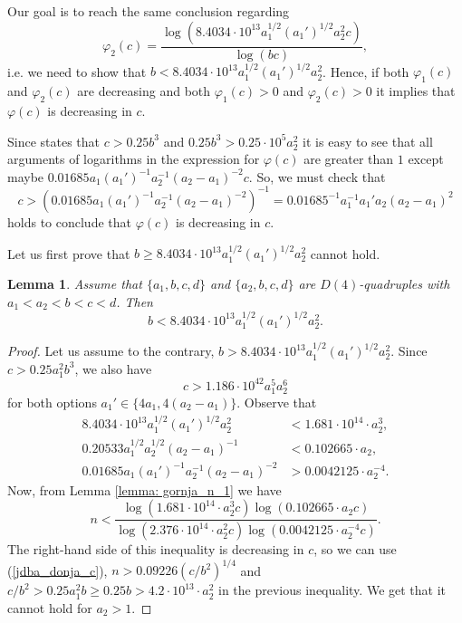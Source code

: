 \documentclass[12pt]{amsart}%
\newtheorem{lemma}[theorem]{Lemma}
\theoremstyle{definition}
\theoremstyle{remark}
\theoremstyle{plain}
\begin{document}
Our goal is to reach the same conclusion regarding
$$\varphi_2(c)=\frac{\log(8.4034 \cdot 10^{13} a_1^{1/2}(a_1')^{1/2}a_2^2c)}{\log(bc)},$$
i.e. we need to show that $b<8.4034 \cdot 10^{13}a_1^{1/2}(a_1')^{1/2}a_2^2$. Hence, if both $\varphi_1(c)$ and $\varphi_2(c)$ are decreasing and both $\varphi_1(c)>0$ and $\varphi_2(c)>0$ it implies that $\varphi(c)$ is decreasing in $c$. 

Since \cite[Theorem 1.2]{mbtap1} states that $c>0.25b^3$ and $0.25b^3>0.25\cdot 10^5a_2^2$ it is easy to see that all arguments of logarithms in the expression for $\varphi(c)$ are greater than $1$ except maybe $0.01685a_1(a_1')^{-1}a_2^{-1}(a_2-a_1)^{-2}c$. So, we must check that 
\begin{equation}\label{ineq:provjera za c}
c>(0.01685a_1(a_1')^{-1}a_2^{-1}(a_2-a_1)^{-2})^{-1}=0.01685^{-1}a_1^{-1}a_1'a_2(a_2-a_1)^2
\end{equation}
holds to conclude that $\varphi(c)$ is decreasing in $c$.

Let us first prove that $b\geq 8.4034 \cdot 10^{13}a_1^{1/2}(a_1')^{1/2}a_2^2$ cannot hold. 

\begin{lemma}\label{lemma: gornja an b}
     Assume that $\{a_1,b,c,d\}$ and $\{a_2,b,c,d\}$ are $D(4)$-quadruples with $a_1<a_2<b<c<d$. Then 
     $$b< 8.4034 \cdot 10^{13}a_1^{1/2}(a_1')^{1/2}a_2^2.$$
\end{lemma}
\begin{proof}
Let us assume to the contrary,  
$b>8.4034 \cdot 10^{13}a_1^{1/2}(a_1')^{1/2}a_2^2.$ 
Since $c>0.25a_1^2b^3$, we also have
\begin{equation}c>1.186\cdot 10^{42}a_1^5a_2^6\label{jdba_donja_c}
\end{equation}
for both options $a_1'\in\{4a_1,4(a_2-a_1)\}$. Observe that 
\begin{align*}8.4034\cdot 10^{13}a_1^{1/2}(a_1')^{1/2}a_2^2&<1.681\cdot 10^{14}\cdot a_2^3,\\
0.20533a_1^{1/2}a_2^{1/2}(a_2-a_1)^{-1}&<0.102665\cdot a_2,\\
0.01685a_1(a_1')^{-1}a_2^{-1}(a_2-a_1)^{-2}&>0.0042125\cdot a_2^{-4}.\end{align*}
Now, from Lemma \ref{lemma: gornja_n_1} we have
$$n<\frac{\log(1.681\cdot 10^{14}\cdot a_2^3c)\log(0.102665\cdot a_2c)}{\log(2.376\cdot 10^{14}\cdot a_2^2c)\log(0.0042125\cdot a_2^{-4}c)}.$$
The right-hand side of this inequality is decreasing in $c$, so we can use (\ref{jdba_donja_c}), $n>0.09226(c/b^2)^{1/4}$ and $c/b^2>0.25a_1^2b\geq 0.25b>4.2\cdot 10^{13}\cdot a_2^2$ in the previous inequality. We get that it cannot hold for $a_2>1$.
\end{proof}
\end{document}
